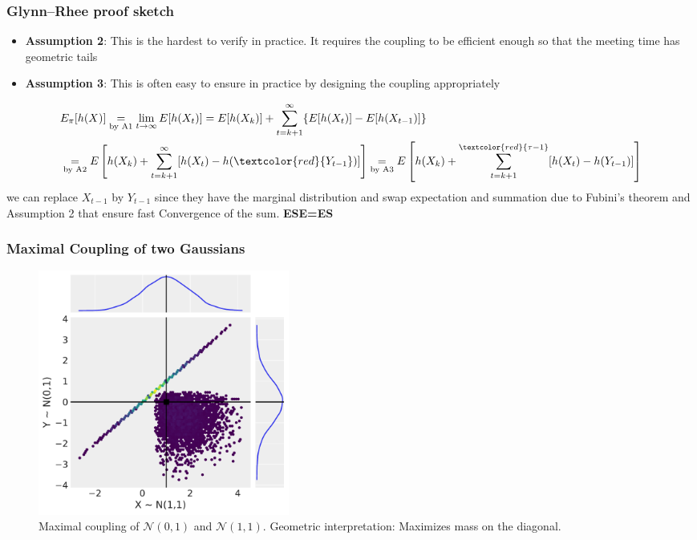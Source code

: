 \begin{frame}
	\frametitle{Glynn--Rhee proof sketch}
	\begin{itemize}
		\item \textbf{Assumption 2}: This is the hardest to verify in practice. It requires the coupling to be efficient enough so that the meeting time has geometric tails
		\item \textbf{Assumption 3}: This is often easy to ensure in practice by designing the coupling appropriately
	\end{itemize}

	\begin{align*}
		 & E_\pi[h(X)] \underset{\text{by A1}}{=} \lim_{t \to \infty} E[h(X_t)] = E[h(X_k)] + \sum_{t=k+1}^{\infty} \{E[h(X_t)] - E[h(X_{t-1})]\} \\
		 & \underset{\text{by A2}}{=} E\left[h(X_k) + \sum_{t=k+1}^{\infty} [h(X_t) - h(\textcolor{red}{Y_{t-1}})]\right]
		\underset{\text{by A3}}{=} E\left[h(X_k) + \sum_{t=k+1}^{\textcolor{red}{\tau-1}} [h(X_t) - h(Y_{t-1})]\right]
	\end{align*}
	{\tiny we can replace $X_{t-1}$ by $Y_{t-1}$ since they have the marginal distribution
	and swap expectation and summation due to Fubini's theorem and Assumption 2 that ensure fast Convergence of the sum.
	\textbf{ESE=ES}}
\end{frame}

\begin{frame}
	\frametitle{Maximal Coupling of two Gaussians}
	\begin{figure}[h]
		\centering
		\includegraphics[width=0.4\textwidth]{maximal_coupling_plot.pdf}
		\caption{Maximal coupling of $\mathcal{N}(0, 1)$ and $\mathcal{N}(1, 1)$. Geometric interpretation: Maximizes mass on the diagonal.}
	\end{figure}
\end{frame}

